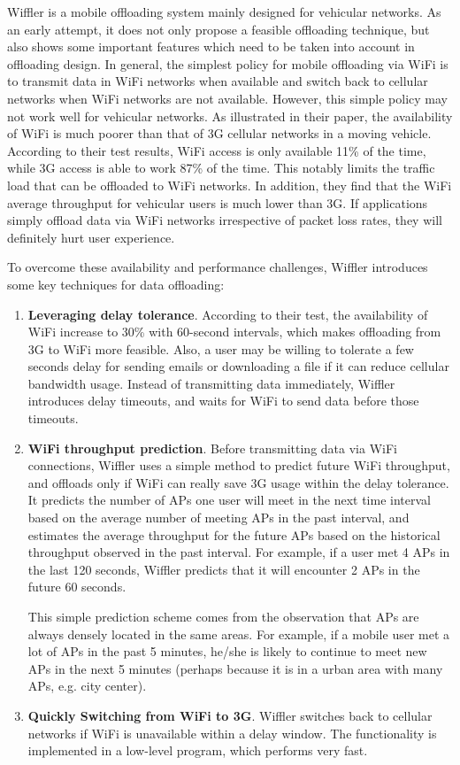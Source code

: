 \documentclass[english]{tktltiki}
\begin{document}
Wiffler \cite{bmv10} is a mobile offloading system mainly designed for vehicular networks. As an early attempt, it does not only propose a feasible offloading technique, but also shows some important features which need to be taken into account in offloading design. In general, the simplest policy for mobile offloading via WiFi is to transmit data in WiFi networks when available and switch back to cellular networks when WiFi networks are not available. However, this simple policy may not work well for vehicular networks. As illustrated in their paper, the availability of WiFi is much poorer than that of 3G cellular networks in a moving vehicle. According to their test results, WiFi access is only available 11\% of the time, while 3G access is able to work 87\% of the time. This notably limits the traffic load that can be offloaded to WiFi networks. In addition, they find that the WiFi average throughput for vehicular users is much lower than 3G. If applications simply offload data via WiFi networks irrespective of packet loss rates, they will definitely hurt user experience.

To overcome these availability and performance challenges, Wiffler introduces some key techniques for data offloading: 

\begin{enumerate}
  \item \textbf{Leveraging delay tolerance}. According to their test, the availability of WiFi increase to 30\% with 60-second intervals, which makes offloading from 3G to WiFi more feasible. Also, a user may be willing to tolerate a few seconds delay for sending emails or downloading a file if it can reduce cellular bandwidth usage. Instead of transmitting data immediately, Wiffler introduces delay timeouts, and waits for WiFi to send data before those timeouts.
  \item \textbf{WiFi throughput prediction}. Before transmitting data via WiFi connections, Wiffler uses a simple method to predict future WiFi throughput, and offloads only if WiFi can really save 3G usage within the delay tolerance. It predicts the number of APs one user will meet in the next time interval based on the average number of meeting APs in the past interval, and estimates the average throughput for the future APs based on the historical throughput observed in the past interval. For example, if a user met 4 APs in the last 120 seconds, Wiffler predicts that it will encounter 2 APs in the future 60 seconds. 
  
This simple prediction scheme comes from the observation that APs are always densely located in the same areas. For example, if a mobile user met a lot of APs in the past 5 minutes, he/she is likely to continue to meet new APs in the next 5 minutes (perhaps because it is in a urban area with many APs, e.g. city center).
  
  \item \textbf{Quickly Switching from WiFi to 3G}. Wiffler switches back to cellular networks if WiFi is unavailable within a delay window. The functionality is implemented in a low-level program, which performs very fast.
\end{enumerate}
\end{document}
